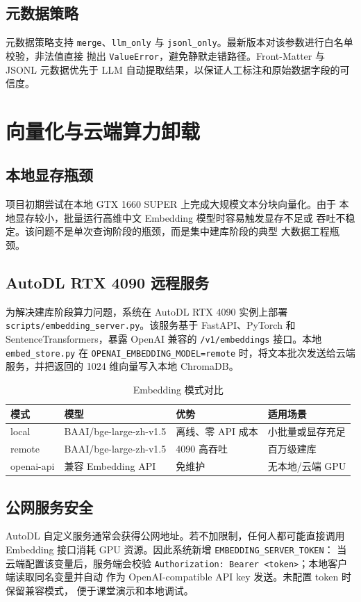 \documentclass[conference]{IEEEtran}
\begin{document}
\subsection{元数据策略}
元数据策略支持 \texttt{merge}、\texttt{llm\_only} 与
\texttt{jsonl\_only}。最新版本对该参数进行白名单校验，非法值直接
抛出 \texttt{ValueError}，避免静默走错路径。Front-Matter 与 JSONL
元数据优先于 LLM 自动提取结果，以保证人工标注和原始数据字段的可信度。

\section{向量化与云端算力卸载}
\subsection{本地显存瓶颈}
项目初期尝试在本地 GTX 1660 SUPER 上完成大规模文本分块向量化。由于
本地显存较小，批量运行高维中文 Embedding 模型时容易触发显存不足或
吞吐不稳定。该问题不是单次查询阶段的瓶颈，而是集中建库阶段的典型
大数据工程瓶颈。

\subsection{AutoDL RTX 4090 远程服务}
为解决建库阶段算力问题，系统在 AutoDL RTX 4090 实例上部署
\texttt{scripts/embedding\_server.py}。该服务基于 FastAPI、PyTorch
和 SentenceTransformers，暴露 OpenAI 兼容的 \texttt{/v1/embeddings}
接口。本地 \texttt{embed\_store.py} 在 \texttt{OPENAI\_EMBEDDING\_MODEL=remote}
时，将文本批次发送给云端服务，并把返回的 1024 维向量写入本地 ChromaDB。

\begin{table}[!t]
\centering
\caption{Embedding 模式对比}
\label{tab:embedding}
\begin{tabular}{@{}llll@{}}
\toprule
\textbf{模式} & \textbf{模型} & \textbf{优势} & \textbf{适用场景} \\
\midrule
local & BAAI/bge-large-zh-v1.5 & 离线、零 API 成本 & 小批量或显存充足 \\
remote & BAAI/bge-large-zh-v1.5 & 4090 高吞吐 & 百万级建库 \\
openai-api & 兼容 Embedding API & 免维护 & 无本地/云端 GPU \\
\bottomrule
\end{tabular}
\end{table}

\subsection{公网服务安全}
AutoDL 自定义服务通常会获得公网地址。若不加限制，任何人都可能直接调用
Embedding 接口消耗 GPU 资源。因此系统新增 \texttt{EMBEDDING\_SERVER\_TOKEN}：
当云端配置该变量后，服务端会校验
\texttt{Authorization: Bearer <token>}；本地客户端读取同名变量并自动
作为 OpenAI-compatible API key 发送。未配置 token 时保留兼容模式，
便于课堂演示和本地调试。
\end{document}
